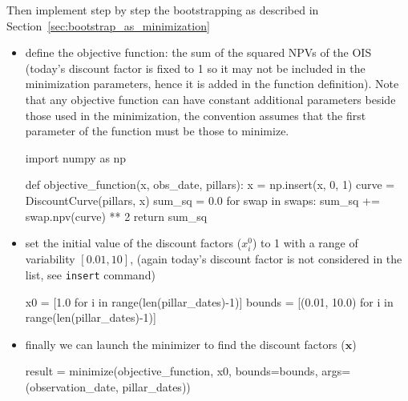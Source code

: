 Then implement step by step the bootstrapping as described in Section~\ref{sec:bootstrap_as_minimization}

\begin{itemize}
\tightlist
\item
  define the objective function: the sum of the squared NPVs of the OIS (today's discount factor is fixed to 1 so it may not be included in the minimization parameters, hence it is added in the function definition). Note that any objective function can have constant additional parameters beside those used in the minimization, the convention assumes that the first parameter of the function must be those to minimize. 

\begin{ipython}
import numpy as np

def objective_function(x, obs_date, pillars):
    x = np.insert(x, 0, 1)
    curve = DiscountCurve(pillars, x)
    sum_sq = 0.0
    for swap in swaps:
        sum_sq += swap.npv(curve) ** 2
    return sum_sq
\end{ipython}

\item
  set the initial value of the discount factors (\(x_i^0\)) to 1 with a
  range of variability \([ 0.01, 10]\), (again today's discount factor is not considered 
  in the list, see \texttt{insert} command)

\begin{ipython}
x0 = [1.0 for i in range(len(pillar_dates)-1)]
bounds = [(0.01, 10.0) for i in range(len(pillar_dates)-1)]
\end{ipython}

\item
  finally we can launch the minimizer to find the discount factors
  (\(\mathbf{x}\))

\begin{ipython}
result = minimize(objective_function, x0, bounds=bounds,
                  args=(observation_date, pillar_dates))


\end{ipython}
\end{itemize}
